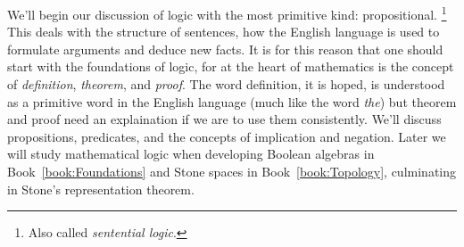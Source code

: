 We'll begin our discussion of logic with the most primitive kind:
propositional.%
\footnote{%
    Also called \textit{sentential logic}.%
}
This deals with the structure of sentences, how the English language is used to
formulate arguments and deduce new facts. It is for this reason that one
should start with the foundations of logic, for at the heart of
mathematics is the concept of \textit{definition}, \textit{theorem}, and
\textit{proof}. The word definition, it is hoped, is understood as a
primitive word in the English language (much like the word \textit{the})
but theorem and proof need an explaination if we are to use them
consistently. We'll discuss propositions, predicates, and the concepts
of implication and negation. Later we will study mathematical logic when
developing Boolean algebras in
Book~\ref{book:Foundations} and Stone spaces in
Book~\ref{book:Topology}, culminating in Stone's representation
theorem.
